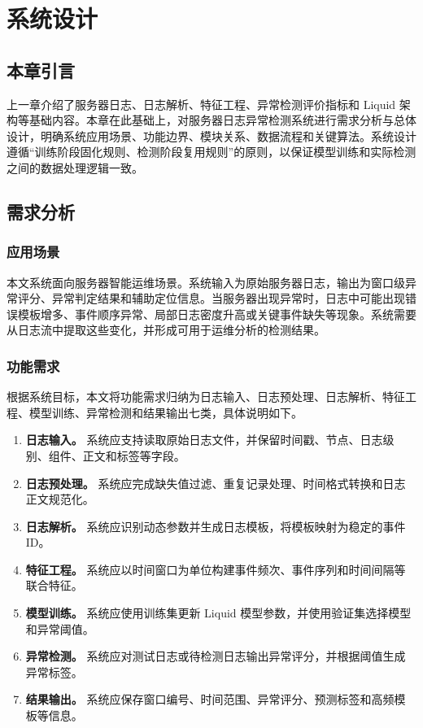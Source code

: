 \chapter{系统设计}
\vspace{7pt}

\section{本章引言}

上一章介绍了服务器日志、日志解析、特征工程、异常检测评价指标和 Liquid 架构等基础内容。本章在此基础上，对服务器日志异常检测系统进行需求分析与总体设计，明确系统应用场景、功能边界、模块关系、数据流程和关键算法。系统设计遵循“训练阶段固化规则、检测阶段复用规则”的原则，以保证模型训练和实际检测之间的数据处理逻辑一致。

\section{需求分析}

\subsection{应用场景}

本文系统面向服务器智能运维场景。系统输入为原始服务器日志，输出为窗口级异常评分、异常判定结果和辅助定位信息。当服务器出现异常时，日志中可能出现错误模板增多、事件顺序异常、局部日志密度升高或关键事件缺失等现象。系统需要从日志流中提取这些变化，并形成可用于运维分析的检测结果。

\subsection{功能需求}

根据系统目标，本文将功能需求归纳为日志输入、日志预处理、日志解析、特征工程、模型训练、异常检测和结果输出七类，具体说明如下。

\begin{enumerate}
    \item \textbf{日志输入。} 系统应支持读取原始日志文件，并保留时间戳、节点、日志级别、组件、正文和标签等字段。
    \item \textbf{日志预处理。} 系统应完成缺失值过滤、重复记录处理、时间格式转换和日志正文规范化。
    \item \textbf{日志解析。} 系统应识别动态参数并生成日志模板，将模板映射为稳定的事件 ID。
    \item \textbf{特征工程。} 系统应以时间窗口为单位构建事件频次、事件序列和时间间隔等联合特征。
    \item \textbf{模型训练。} 系统应使用训练集更新 Liquid 模型参数，并使用验证集选择模型和异常阈值。
    \item \textbf{异常检测。} 系统应对测试日志或待检测日志输出异常评分，并根据阈值生成异常标签。
    \item \textbf{结果输出。} 系统应保存窗口编号、时间范围、异常评分、预测标签和高频模板等信息。
\end{enumerate}

